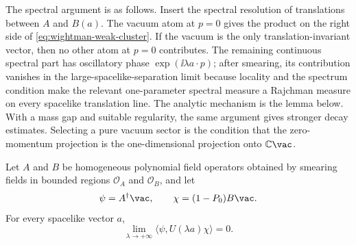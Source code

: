 The spectral argument is as follows.  Insert the spectral resolution of
translations between \(A\) and \(B(a)\).  The vacuum atom at \(p=0\) gives the
product on the right side of \eqref{eq:wightman-weak-cluster}.  If the vacuum
is the only translation-invariant vector, then no other atom at \(p=0\)
contributes.  The remaining continuous spectral part has oscillatory phase
\(\exp(\ii\lambda a\cdot p)\); after smearing, its contribution vanishes in
the large-spacelike-separation limit because locality and the spectrum
condition make the relevant one-parameter spectral measure a Rajchman measure
on every spacelike translation line.  The analytic mechanism is the lemma
below.  With a mass gap and suitable regularity, the same argument gives
stronger decay estimates.  Selecting a pure vacuum sector is the condition
that the zero-momentum projection is the one-dimensional projection onto
\(\mathbb C\vac\).

\begin{lemma}
\label{lem:wightman-jost-cluster-step}
Let \(A\) and \(B\) be homogeneous polynomial field operators obtained by
smearing fields in bounded regions \(\mathcal O_A\) and \(\mathcal O_B\), and
let
\[
  \psi=A^\dagger\vac,\qquad
  \chi=(1-P_0)B\vac .
\]
For every spacelike vector \(a\),
\begin{equation}
  \lim_{\lambda\to+\infty}
  \langle \psi,U(\lambda a)\chi\rangle=0 .
  \label{eq:jost-cluster-local-vector-limit}
\end{equation}
\end{lemma}

